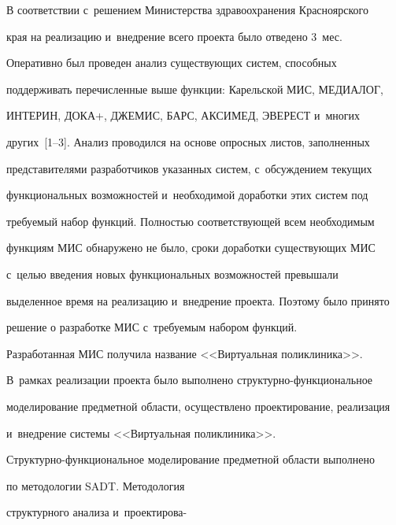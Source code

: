   


  В соответствии с~решением Министерства здравоохранения Красноярского 


края на реализацию и~внедрение всего проекта было отведено 3~мес. 


Оперативно был проведен анализ существующих систем, способных 


поддерживать перечисленные выше функции: Карельской МИС, МЕДИАЛОГ, 


ИНТЕРИН, ДОКА+, ДЖЕМИС, БАРС, АКСИМЕД, ЭВЕРЕСТ и~многих 


других~[1--3]. Анализ проводился на основе опросных листов, заполненных 


представителями разработчиков указанных систем, с~обсуждением текущих 


функциональных возможностей и~необходимой доработки этих систем под 


требуемый набор функций. Полностью соответствующей всем необходимым 


функциям МИС обнаружено не было, сроки доработки существующих МИС 


с~целью введения новых функциональных возможностей превышали 


выделенное время на реализацию и~внедрение проекта. Поэтому было принято 


решение о разработке МИС с~требуемым набором функций. 


  


  Разработанная МИС получила название <<Виртуальная поликлиника>>. 


В~рамках реализации проекта было выполнено струк\-тур\-но-функ\-ци\-о\-наль\-ное 


моделирование предметной области, осуществлено проектирование, реализация 


и~внедрение системы <<Виртуальная поликлиника>>.


  


  Структурно-функциональное моделирование предметной области выполнено 


по методологии SADT. Методология 


структурного анализа и~проектирова-\linebreak\vspace*{-12pt}





\pagebreak






